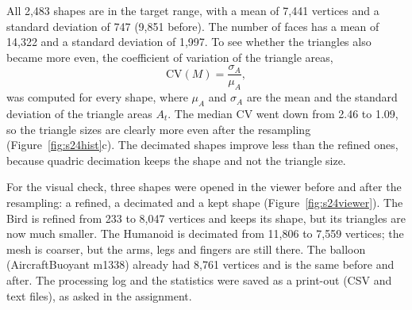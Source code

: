 \documentclass[10pt,a4paper]{article}
\begin{document}
All 2,483 shapes are in the target range, with a mean of 7,441 vertices and a standard deviation of 747 (9,851 before). The
number of faces has a mean of 14,322 and a standard deviation of 1,997. To see whether the triangles also became more even, the
coefficient of variation of the triangle areas,
\begin{equation}
  \mathrm{CV}(M)=\frac{\sigma_A}{\mu_A},
  \label{eq:cv}
\end{equation}
was computed for every shape, where $\mu_A$ and $\sigma_A$ are the mean and the standard deviation of the triangle areas $A_t$.
The median CV went down from 2.46 to 1.09, so the triangle sizes are clearly more even after the resampling
(Figure~\ref{fig:s24hist}c). The decimated shapes improve less than the refined ones, because quadric decimation keeps the shape
and not the triangle size.

For the visual check, three shapes were opened in the viewer before and after the resampling: a refined, a decimated and a kept
shape (Figure~\ref{fig:s24viewer}). The Bird is refined from 233 to 8,047 vertices and keeps its shape, but its triangles are now
much smaller. The Humanoid is decimated from 11,806 to 7,559 vertices; the mesh is coarser, but the arms, legs and fingers are still
there. The balloon (AircraftBuoyant m1338) already had 8,761 vertices and is the same before and after. The processing log and the
statistics were saved as a print-out (CSV and text files), as asked in the assignment.
\end{document}
